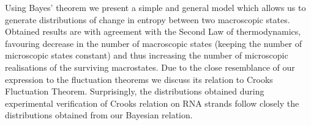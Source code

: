 \documentclass[a0]{sciposter}
\begin{document}



\vspace{1.0cm}



Using Bayes' theorem we present a simple and general model which allows us to generate distributions of change in entropy between two macroscopic states. Obtained results are with agreement with the Second Law of thermodynamics, favouring decrease in the number of macroscopic states (keeping the number of microscopic states constant) and thus increasing the number of microscopic realisations of the surviving macrostates.
Due to the close resemblance of our expression to the fluctuation theorems we discuss its relation to Crooks Fluctuation Theorem. Surprisingly, the distributions obtained during experimental verification of Crooks relation on RNA strands follow closely the distributions obtained from our Bayesian relation.
\end{document}
